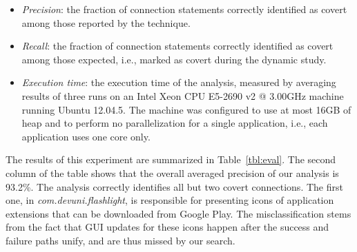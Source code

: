 \begin{itemize}[leftmargin=0.5cm]%
\item \emph{Precision}: the fraction of connection statements correctly identified as covert among those reported by the technique.
\item \emph{Recall}: the fraction of connection statements correctly identified as covert among those expected, i.e., marked as covert during the dynamic study. 
\item \emph{Execution time}: the execution time of the analysis, measured by averaging results of
three runs on an Intel\textsuperscript{\textregistered} Xeon\textsuperscript{\textregistered} CPU E5-2690 v2 @ 3.00GHz machine running Ubuntu 12.04.5. The machine was configured to use at most 16GB of heap and to perform no parallelization for a single application, i.e., each application uses one core only.
\end{itemize}
  
The results of this experiment are summarized in Table~\ref{tbl:eval}.  
The second column of the table shows that the overall averaged precision of our analysis is 93.2\%. 
The analysis correctly identifies all but two covert connections. 
The first one, in \emph{com.devuni.flashlight}, is responsible for presenting icons of application extensions that can be downloaded from Google Play. The misclassification stems from the fact that GUI updates for these icons happen after the success and failure paths unify, and are thus missed by our search. 

